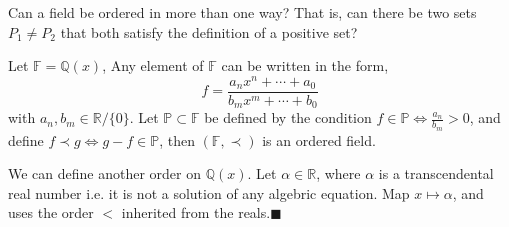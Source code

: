 \documentclass[addpoints]{exam}
\theoremstyle{mytheoremstyle}
\theoremstyle{mytheoremstyle}
\theoremstyle{myproblemstyle}
\begin{document}
\begin{questions}
    \newpage

    \question[1] Can a field be ordered in more than one way? That is, can there be two sets \(P_1 \neq P_2\) that both satisfy the definition of a positive set?
    \begin{solution}
        Let \(\mathbb{F}=\mathbb{Q}(x)\), Any element of \(\mathbb{F}\) can be written in the form,
        \[f=\frac{a_nx^n+\cdots+a_0}{b_mx^m+\cdots+b_0}\]
        with \(a_n,b_m\in\mathbb{R}/\{0\}\). Let \(\mathbb{P}\subset\mathbb{F}\) be defined by the condition \(\displaystyle f\in\mathbb{P}\iff \frac{a_n}{b_m}>0\), and define \(\displaystyle f\prec g\iff g-f\in\mathbb{P}\), then \((\mathbb{F},\prec)\) is an ordered field.

        We can define another order on \(\mathbb{Q}(x)\). Let \(\alpha\in\mathbb{R}\), where \(\alpha\) is a transcendental real number i.e. it is not a solution of any algebric equation. Map \(x\longmapsto\alpha\), and uses the order \(<\) inherited from the reals.\hfill\(\blacksquare\)
    \end{solution}
\end{questions}
\end{document}
